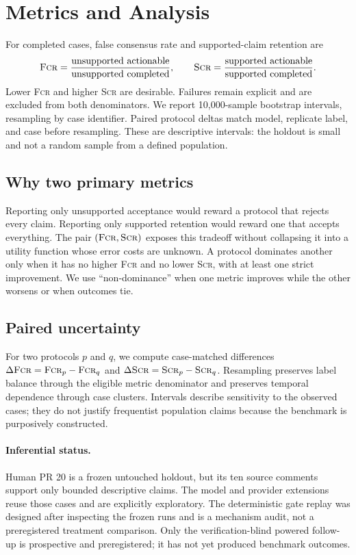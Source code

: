 \documentclass[acmsmall,screen,review,anonymous]{acmart}
\newcommand{\fcr}{\textsc{Fcr}\xspace}
\newcommand{\scr}{\textsc{Scr}\xspace}
\begin{document}
\section{Metrics and Analysis}

For completed cases, false consensus rate and supported-claim retention are
\[
\fcr = \frac{\mathrm{unsupported\ actionable}}{\mathrm{unsupported\ completed}},\qquad
\scr = \frac{\mathrm{supported\ actionable}}{\mathrm{supported\ completed}}.
\]
Lower \fcr and higher \scr are desirable. Failures remain explicit and are excluded from both denominators. We report 10,000-sample bootstrap intervals, resampling by case identifier. Paired protocol deltas match model, replicate label, and case before resampling. These are descriptive intervals: the holdout is small and not a random sample from a defined population.

\subsection{Why two primary metrics}

Reporting only unsupported acceptance would reward a protocol that rejects every claim. Reporting only supported retention would reward one that accepts everything. The pair $(\fcr,\scr)$ exposes this tradeoff without collapsing it into a utility function whose error costs are unknown. A protocol dominates another only when it has no higher \fcr and no lower \scr, with at least one strict improvement. We use ``non-dominance'' when one metric improves while the other worsens or when outcomes tie.

\subsection{Paired uncertainty}

For two protocols $p$ and $q$, we compute case-matched differences $\Delta\fcr=\fcr_p-\fcr_q$ and $\Delta\scr=\scr_p-\scr_q$. Resampling preserves label balance through the eligible metric denominator and preserves temporal dependence through case clusters. Intervals describe sensitivity to the observed cases; they do not justify frequentist population claims because the benchmark is purposively constructed.

\paragraph{Inferential status.}
Human PR 20 is a frozen untouched holdout, but its ten source comments support only bounded descriptive claims. The model and provider extensions reuse those cases and are explicitly exploratory. The deterministic gate replay was designed after inspecting the frozen runs and is a mechanism audit, not a preregistered treatment comparison. Only the verification-blind powered follow-up is prospective and preregistered; it has not yet produced benchmark outcomes.
\end{document}
